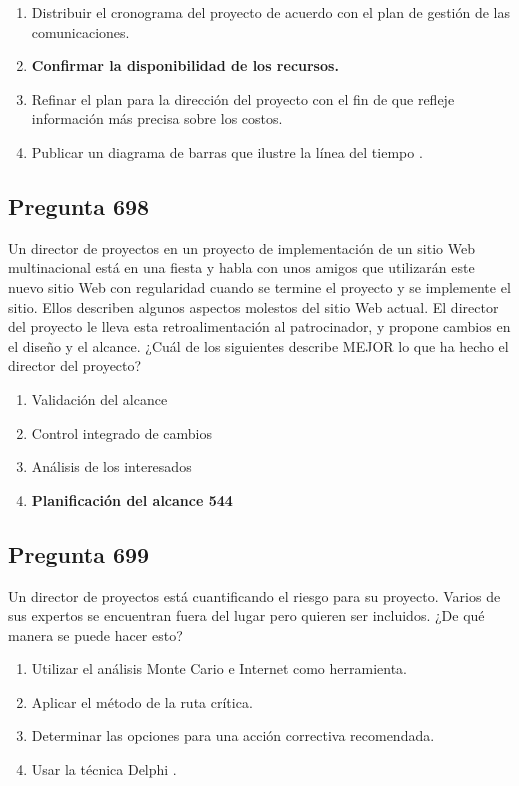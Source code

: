 \documentclass[11pt,a4paper]{article}
\begin{document}
\begin{enumerate}[label=\alph*)]
  \item Distribuir el cronograma del proyecto de acuerdo con el plan de gestión de las comunicaciones.
  \item \textbf{Confirmar la disponibilidad de los recursos.}
  \item Refinar el plan para la dirección del proyecto con el fin de que refleje información más precisa sobre los costos.
  \item Publicar un diagrama de barras que ilustre la línea del tiempo .
\end{enumerate}

\subsection*{Pregunta 698}
Un director de proyectos en un proyecto de implementación de un sitio Web multinacional está en una fiesta y habla con unos amigos que utilizarán este nuevo sitio Web con regularidad cuando se termine el proyecto y se implemente el sitio. Ellos describen algunos aspectos molestos del sitio Web actual. El director del proyecto le lleva esta retroalimentación al patrocinador, y propone cambios en el diseño y el alcance. ¿Cuál de los siguientes describe MEJOR lo que ha hecho el director del proyecto?

\begin{enumerate}[label=\alph*)]
  \item Validación del alcance
  \item Control integrado de cambios
  \item Análisis de los interesados
  \item \textbf{Planificación del alcance 544}
\end{enumerate}

\subsection*{Pregunta 699}
Un director de proyectos está cuantificando el riesgo para su proyecto. Varios de sus expertos se encuentran fuera del lugar pero quieren ser incluidos. ¿De qué manera se puede hacer esto?

\begin{enumerate}[label=\alph*)]
  \item Utilizar el análisis Monte Cario e Internet como herramienta.
  \item Aplicar el método de la ruta crítica.
  \item Determinar las opciones para una acción correctiva recomendada.
  \item Usar la técnica Delphi .
\end{enumerate}
\end{document}
